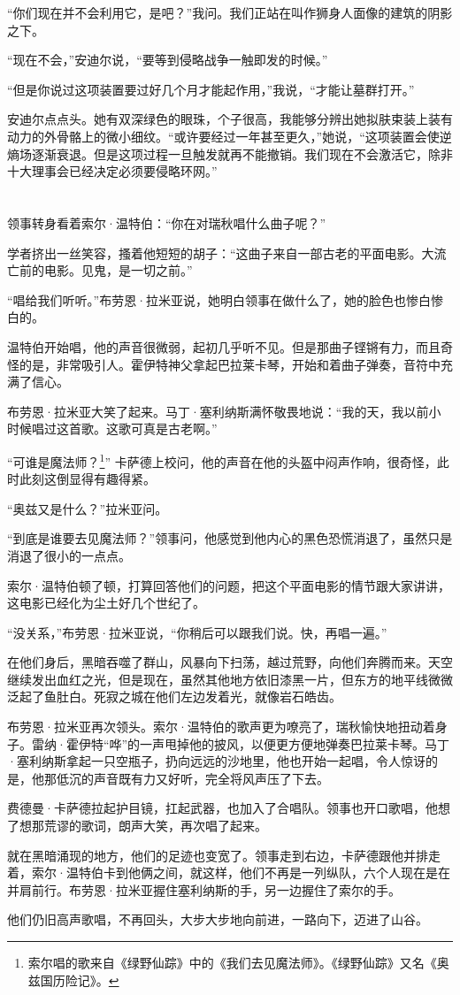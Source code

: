\documentclass[
  b5paper, 
  10pt, 
  AutoFakeBold, 
  AutoFakeSlant
]{article}
\begin{document}
“你们现在并不会利用它，是吧？”我问。我们正站在叫作狮身人面像的建筑的阴影之下。

“现在不会，”安迪尔说，“要等到侵略战争一触即发的时候。”

“但是你说过这项装置要过好几个月才能起作用，”我说，“才能让墓群打开。”

安迪尔点点头。她有双深绿色的眼珠，个子很高，我能够分辨出她拟肤束装上装有动力的外骨骼上的微小细纹。“或许要经过一年甚至更久，”她说，“这项装置会使逆熵场逐渐衰退。但是这项过程一旦触发就再不能撤销。我们现在不会激活它，除非十大理事会已经决定必须要侵略环网。”

\section{}

领事转身看着索尔·温特伯：“你在对瑞秋唱什么曲子呢？”

学者挤出一丝笑容，搔着他短短的胡子：“这曲子来自一部古老的平面电影。大流亡前的电影。见鬼，是一切之前。”

“唱给我们听听。”布劳恩·拉米亚说，她明白领事在做什么了，她的脸色也惨白惨白的。

温特伯开始唱，他的声音很微弱，起初几乎听不见。但是那曲子铿锵有力，而且奇怪的是，非常吸引人。霍伊特神父拿起巴拉莱卡琴，开始和着曲子弹奏，音符中充满了信心。

布劳恩·拉米亚大笑了起来。马丁·塞利纳斯满怀敬畏地说：“我的天，我以前小时候唱过这首歌。这歌可真是古老啊。”

“可谁是魔法师？\footnote{索尔唱的歌来自《绿野仙踪》中的《我们去见魔法师》。《绿野仙踪》又名《奥兹国历险记》。}”
卡萨德上校问，他的声音在他的头盔中闷声作响，很奇怪，此时此刻这倒显得有趣得紧。

“奥兹又是什么？”拉米亚问。

“到底是谁要去见魔法师？”领事问，他感觉到他内心的黑色恐慌消退了，虽然只是消退了很小的一点点。

索尔·温特伯顿了顿，打算回答他们的问题，把这个平面电影的情节跟大家讲讲，这电影已经化为尘土好几个世纪了。

“没关系，”布劳恩·拉米亚说，“你稍后可以跟我们说。快，再唱一遍。”

在他们身后，黑暗吞噬了群山，风暴向下扫荡，越过荒野，向他们奔腾而来。天空继续发出血红之光，但是现在，虽然其他地方依旧漆黑一片，但东方的地平线微微泛起了鱼肚白。死寂之城在他们左边发着光，就像岩石皓齿。

布劳恩·拉米亚再次领头。索尔·温特伯的歌声更为嘹亮了，瑞秋愉快地扭动着身子。雷纳·霍伊特“哗”的一声甩掉他的披风，以便更方便地弹奏巴拉莱卡琴。马丁·塞利纳斯拿起一只空瓶子，扔向远远的沙地里，他也开始一起唱，令人惊讶的是，他那低沉的声音既有力又好听，完全将风声压了下去。

费德曼·卡萨德拉起护目镜，扛起武器，也加入了合唱队。领事也开口歌唱，他想了想那荒谬的歌词，朗声大笑，再次唱了起来。

就在黑暗涌现的地方，他们的足迹也变宽了。领事走到右边，卡萨德跟他并排走着，索尔·温特伯卡到他俩之间，就这样，他们不再是一列纵队，六个人现在是在并肩前行。布劳恩·拉米亚握住塞利纳斯的手，另一边握住了索尔的手。

他们仍旧高声歌唱，不再回头，大步大步地向前进，一路向下，迈进了山谷。
\cite{hyperion}

\setlength{\parskip}{0cm}
\printbibliography
\end{document}
